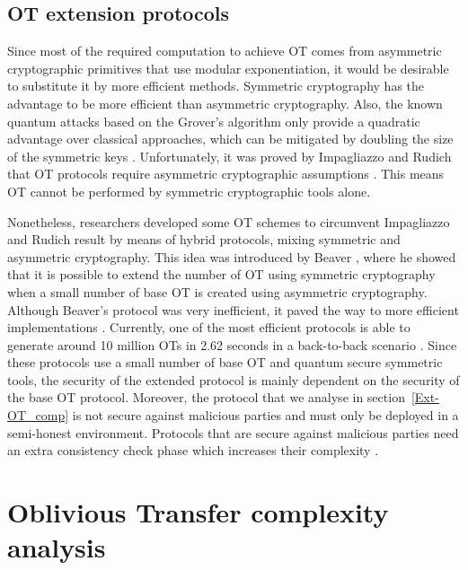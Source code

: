 \subsection{OT extension protocols} \label{Ext-OT}

Since most of the required computation to achieve OT comes from asymmetric cryptographic primitives that use modular exponentiation, it would be desirable to substitute it by more efficient methods. Symmetric cryptography has the advantage to be more efficient than asymmetric cryptography. Also, the known quantum attacks based on the Grover's algorithm only provide a quadratic advantage over classical approaches, which can be mitigated by doubling the size of the symmetric keys \cite{Bernstein2017}. Unfortunately, it was proved by Impagliazzo and Rudich that OT protocols require asymmetric cryptographic assumptions \cite{IR99}. This means OT cannot be performed by symmetric cryptographic tools alone.

Nonetheless, researchers developed some OT schemes to circumvent Impagliazzo and Rudich result by means of hybrid protocols, mixing symmetric and asymmetric cryptography. This idea was introduced by Beaver \cite{B96}, where he showed that it is possible to extend the number of OT using symmetric cryptography when a small number of base OT is created using asymmetric cryptography. Although Beaver's protocol was very inefficient, it paved the way to more efficient implementations \cite{IKNP03, N07, NNOB12, ALSZ13, ALSZ15}. Currently, one of the most efficient protocols is able to generate around 10 million OTs in 2.62 seconds in a back-to-back scenario \cite{ALSZ13}. Since these protocols use a small number of base OT and quantum secure symmetric tools, the security of the extended protocol is mainly dependent on the security of the base OT protocol. Moreover, the protocol that we analyse in section~\ref{Ext-OT_comp} \cite{ALSZ13} is not secure against malicious parties and must only be deployed in a semi-honest environment. Protocols that are secure against malicious parties need an extra consistency check phase which increases their complexity \cite{ALSZ15, KOS15}.


\section{Oblivious Transfer complexity analysis} \label{HQOT_comp}

